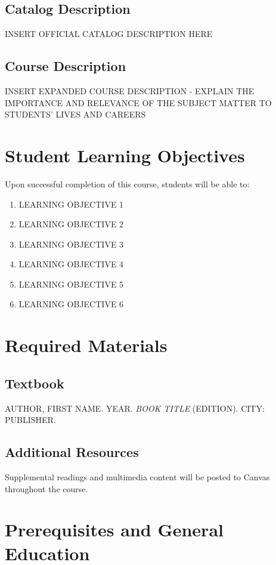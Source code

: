 \documentclass[11pt]{scrartcl} %
\begin{document}
\subsection{Catalog Description}
INSERT OFFICIAL CATALOG DESCRIPTION HERE

\subsection{Course Description}
INSERT EXPANDED COURSE DESCRIPTION - EXPLAIN THE IMPORTANCE AND RELEVANCE OF THE SUBJECT MATTER TO STUDENTS' LIVES AND CAREERS

\section{Student Learning Objectives}
Upon successful completion of this course, students will be able to:

\begin{enumerate}
\item LEARNING OBJECTIVE 1
\item LEARNING OBJECTIVE 2
\item LEARNING OBJECTIVE 3
\item LEARNING OBJECTIVE 4
\item LEARNING OBJECTIVE 5
\item LEARNING OBJECTIVE 6
\end{enumerate}

\section{Required Materials}

\subsection{Textbook}
AUTHOR, FIRST NAME. YEAR. \emph{BOOK TITLE} (EDITION). CITY: PUBLISHER.

\subsection{Additional Resources}
Supplemental readings and multimedia content will be posted to Canvas throughout the course.

\section{Prerequisites and General Education}
\end{document}
